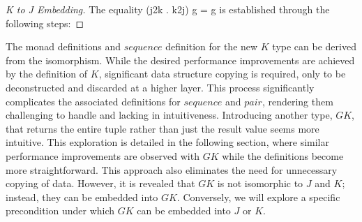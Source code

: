 \begin{proof}[K to J Embedding]
The equality (j2k . k2j) g = g is established through the following steps:

\resethooks

\end{proof}

The monad definitions and $sequence$ definition for the new $K$ type can be derived from 
the isomorphism. While the desired performance improvements are achieved by the definition
of $K$, significant data structure copying is required, only to be deconstructed and 
discarded at a higher layer. This process significantly complicates the associated 
definitions for $sequence$ and $pair$, rendering them challenging to handle and lacking in 
intuitiveness.
Introducing another type, $GK$, that returns the entire tuple rather than just the result 
value seems more intuitive. This exploration is detailed in the following section, where 
similar performance improvements are observed with $GK$ while the definitions become more 
straightforward. This approach also eliminates the need for unnecessary copying of data. 
However, it is revealed that $GK$ is not isomorphic to $J$ and $K$; instead, they can be 
embedded into $GK$. Conversely, we will explore a specific precondition under which $GK$ 
can be embedded into $J$ or $K$.

